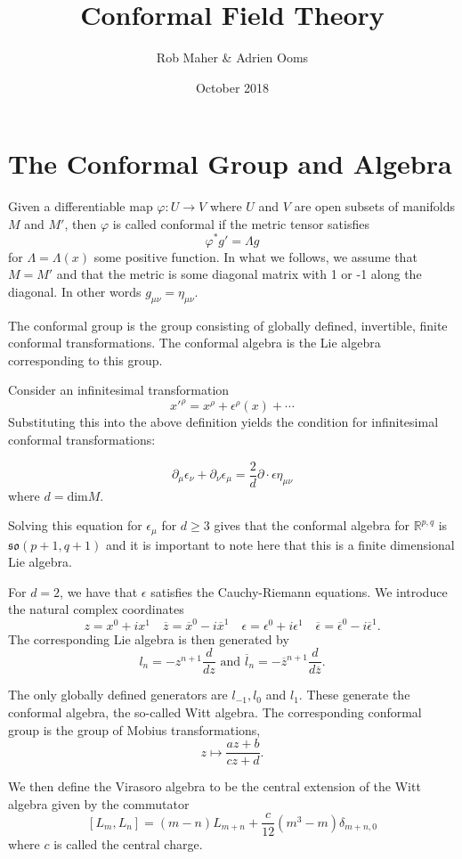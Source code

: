 \documentclass{article}
\title{Conformal Field Theory}
\author{Rob Maher \& Adrien Ooms}
\date{October 2018}
\newcommand{\R}{\mathbb{R}}
\begin{document}
\maketitle

\section{The Conformal Group and Algebra}

Given a differentiable map $\varphi: U \rightarrow V$ where $U$ and $V$ are open subsets of manifolds $M$ and $M'$, then $\varphi$ is called conformal if the metric tensor satisfies $$\varphi^*g'=\Lambda g$$ for $\Lambda=\Lambda(x)$ some positive function. In what we follows, we assume that $M=M'$ and that the metric is some diagonal matrix with 1 or -1 along the diagonal. In other words $g_{\mu\nu}=\eta_{\mu\nu}$.

The conformal group is the group consisting of globally defined, invertible, finite conformal transformations. The conformal algebra is the Lie algebra corresponding to this group. 

Consider an infinitesimal transformation $$x'^{\rho}=x^{\rho}+\epsilon^{\rho}(x)+\cdots$$ Substituting this into the above definition yields the condition for infinitesimal conformal transformations: 

$$\partial_{\mu}\epsilon_{\nu}+\partial_{\nu}\epsilon_{\mu}=\frac{2}{d}\partial \cdot \epsilon \eta_{\mu\nu}$$ where $d=\text{dim} M$.

Solving this equation for $\epsilon_{\mu}$ for $d \geq 3$ gives that the conformal algebra for $\R^{p,q}$ is $\mathfrak{so}(p+1,q+1)$ and it is important to note here that this is a finite dimensional Lie algebra.

For $d=2$, we have that $\epsilon$ satisfies the Cauchy-Riemann equations. We introduce the natural complex coordinates $$ z=x^0+ix^1 \quad \overline{z}=\overline{x}^0-i\overline{x}^1 \quad \epsilon=\epsilon^0+i\epsilon^1 \quad \overline{\epsilon}=\overline{\epsilon}^0-i\overline{\epsilon}^1.$$  The corresponding Lie algebra is then generated by $$l_n=-z^{n+1}\frac{d}{dz} \text{ and } \overline{l}_n=-\overline{z}^{n+1}\frac{d}{d\overline{z}}.$$

The only globally defined generators are $l_{-1},l_0$ and $l_1$. These generate the conformal algebra, the so-called Witt algebra. The corresponding conformal group is the group of M\:obius transformations, $$z \mapsto \frac{az+b}{cz+d}.$$ 

We then define the Virasoro algebra to be the central extension of the Witt algebra given by the commutator $$[L_m,L_n]=(m-n)L_{m+n}+\frac{c}{12}(m^3-m)\delta_{m+n,0}$$
where $c$ is called the central charge. 
\end{document}
